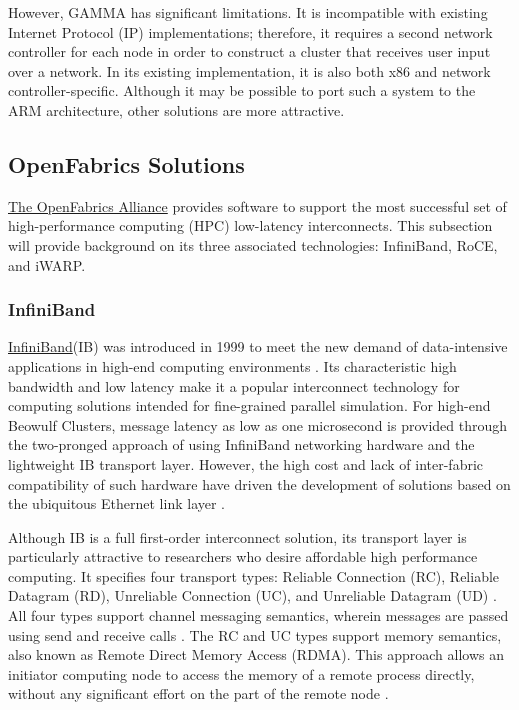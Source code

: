 \documentclass[11pt]{book}
\begin{document}
However, GAMMA has significant limitations. It is incompatible with existing
Internet Protocol (IP) implementations; therefore, it requires a second network
controller for each node in order to construct a cluster that receives user
input over a network. In its existing implementation, it is also both x86 and
network controller-specific. Although it may be possible to port such a system
to the ARM architecture, other solutions are more attractive.

\subsection{\textbf{OpenFabrics Solutions}}

\href{www.openfabrics.org}{The OpenFabrics Alliance} provides software to
support the most successful set of high-performance computing (HPC) low-latency
interconnects. This subsection will provide background on its three associated
technologies: InfiniBand, RoCE, and iWARP.

\subsubsection{\textbf{InfiniBand}}

\href {www.infinibandta.org}{InfiniBand}\texttrademark (IB) was introduced in
1999 to meet the new demand of data-intensive applications in high-end computing
environments \cite{InfiniBandTABase-07}. Its characteristic high bandwidth and
low latency make it a popular interconnect technology for computing solutions
intended for fine-grained parallel simulation. For high-end Beowulf Clusters,
message latency as low as one microsecond is provided through the two-pronged
approach of using InfiniBand networking hardware and the lightweight IB
transport layer. However, the high cost and lack of inter-fabric compatibility
of such hardware have driven the development of solutions based on the
ubiquitous Ethernet link layer \cite{roce-announce}.

Although IB is a full first-order interconnect solution, its transport layer is
particularly attractive to researchers who desire affordable high performance
computing. It specifies four transport types: Reliable Connection (RC), Reliable
Datagram (RD), Unreliable Connection (UC), and Unreliable Datagram (UD)
\cite{InfiniBandTABase-07}. All four types support channel messaging semantics,
wherein messages are passed using send and receive calls
\cite{InfiniBandTABase-07}. The RC and UC types support memory semantics, also
known as Remote Direct Memory Access (RDMA). This approach allows an initiator
computing node to access the memory of a remote process directly, without any
significant effort on the part of the remote node \cite{sur-11}.
\end{document}
